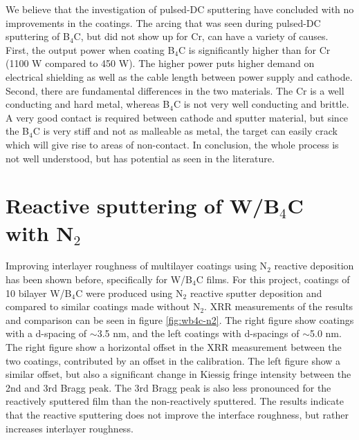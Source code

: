 We believe that the investigation of pulsed-DC sputtering have concluded with no improvements in the coatings. The arcing that was seen during pulsed-DC sputtering of B$_4$C, but did not show up for Cr, can have a variety of causes. First, the output power when coating B$_4$C is significantly higher than for Cr (1100 W compared to 450 W). The higher power puts higher demand on electrical shielding as well as the cable length between power supply and cathode. Second, there are fundamental differences in the two materials. The Cr is a well conducting and hard metal, whereas B$_4$C is not very well conducting and brittle. A very good contact is required between cathode and sputter material, but since the B$_4$C is very stiff and not as malleable as metal, the target can easily crack which will give rise to areas of non-contact. In conclusion, the whole process is not well understood, but has potential as seen in the literature.

\section{Reactive sputtering of W/B$_4$C with N$_2$}
Improving interlayer roughness of multilayer coatings using N$_2$ reactive deposition has been shown before\cite{Windt:2007uj,jakobsen2010developing}, specifically for W/B$_4$C films. For this project, coatings of 10 bilayer W/B$_4$C were produced using N$_2$ reactive sputter deposition and compared to similar coatings made without N$_2$. XRR measurements of the results and comparison can be seen in figure \ref{fig:wb4c-n2}. The right figure show coatings with a d-spacing of $\sim$3.5 nm, and the left coatings with d-spacings of $\sim$5.0 nm. The right figure show a horizontal offset in the XRR measurement between the two coatings, contributed by an offset in the calibration. The left figure show a similar offset, but also a significant change in Kiessig fringe intensity between the 2nd and 3rd Bragg peak. The 3rd Bragg peak is also less pronounced for the reactively sputtered film than the non-reactively sputtered. The results indicate that the reactive sputtering does not improve the interface roughness, but rather increases interlayer roughness.

